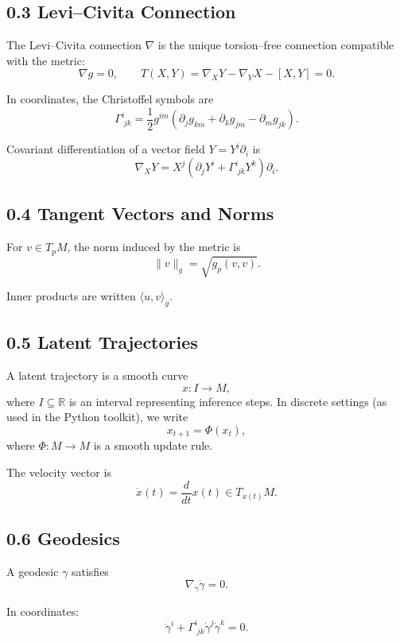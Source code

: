 \subsection*{0.3 Levi–Civita Connection}

The Levi–Civita connection $\nabla$ is the unique torsion–free connection
compatible with the metric:
\[
\nabla g = 0, \qquad T(X,Y) = \nabla_X Y - \nabla_Y X - [X,Y] = 0.
\]

In coordinates, the Christoffel symbols are
\[
\Gamma^i_{\;jk}
= \frac{1}{2} g^{im}
\left(
\partial_j g_{km}
+ \partial_k g_{jm}
- \partial_m g_{jk}
\right).
\]

Covariant differentiation of a vector field $Y = Y^i \partial_i$ is
\[
\nabla_X Y
= X^j \left( \partial_j Y^i + \Gamma^i_{\;jk} Y^k \right) \partial_i.
\]

\subsection*{0.4 Tangent Vectors and Norms}

For $v \in T_p M$, the norm induced by the metric is
\[
\|v\|_g = \sqrt{g_p(v,v)}.
\]

Inner products are written $\langle u, v \rangle_g$.

\subsection*{0.5 Latent Trajectories}

A latent trajectory is a smooth curve
\[
x : I \to M,
\]
where $I \subseteq \mathbb{R}$ is an interval representing inference
steps. In discrete settings (as used in the Python toolkit), we write
\[
x_{t+1} = \Phi(x_t),
\]
where $\Phi : M \to M$ is a smooth update rule.

The velocity vector is
\[
\dot{x}(t) = \frac{d}{dt} x(t) \in T_{x(t)} M.
\]

\subsection*{0.6 Geodesics}

A geodesic $\gamma$ satisfies
\[
\nabla_{\dot{\gamma}} \dot{\gamma} = 0.
\]

In coordinates:
\[
\ddot{\gamma}^i + \Gamma^i_{\;jk} \dot{\gamma}^j \dot{\gamma}^k = 0.
\]

